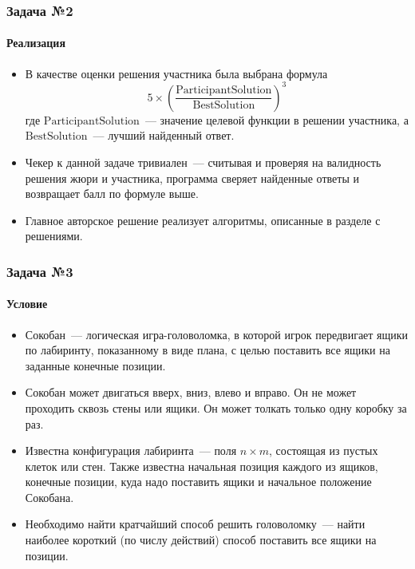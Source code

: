 \documentclass{beamer}
\begin{document}
\begin{frame}
\frametitle{Задача №2}
\framesubtitle{Реализация}
\begin{itemize}
\item В качестве оценки решения участника была выбрана формула $$5 \times\left(\frac{\text {ParticipantSolution}}{\text {BestSolution}}\right)^{3}$$где $\text{ParticipantSolution}$~--- значение целевой функции в решении участника, а $\text{BestSolution}$~--- лучший найденный ответ.

\item Чекер к данной задаче тривиален~--- считывая и проверяя на валидность решения жюри и участника, программа сверяет найденные ответы и возвращает балл по формуле выше.

\item Главное авторское решение реализует алгоритмы, описанные в разделе с решениями.

\end{itemize}
\end{frame}








\begin{frame}
\frametitle{Задача №3}
\framesubtitle{Условие}
\begin{itemize}
\item Сокобан~--- логическая игра-головоломка, в которой игрок передвигает ящики по лабиринту, показанному в виде плана, с целью поставить все ящики на заданные конечные позиции. 
\item Сокобан может двигаться вверх, вниз, влево и вправо. Он не может проходить сквозь стены или ящики. Он может толкать только одну коробку за раз.
\item Известна конфигурация лабиринта~--- поля $n\times m$, состоящая из пустых клеток или стен. Также известна начальная позиция каждого из ящиков, конечные позиции, куда надо поставить ящики и начальное положение Сокобана.
\item Необходимо найти кратчайший способ решить головоломку~--- найти наиболее короткий (по числу действий) способ поставить все ящики на позиции.
\end{itemize}
\end{frame}
\end{document}
